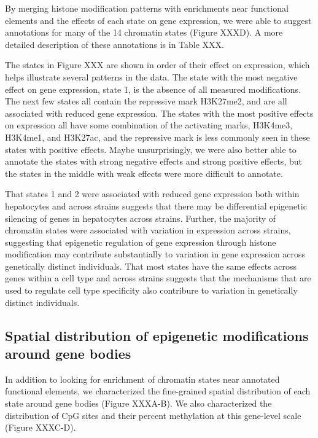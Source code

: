 \documentclass[10pt,letterpaper]{article}
\begin{document}
By merging histone modification patterns with enrichments near
functional elements and the effects of each state on gene expression, we
were able to suggest annotations for many of the 14 chromatin states
(Figure XXXD). A more detailed description of these annotations is in
Table XXX.

The states in Figure XXX are shown in order of their effect on
expression, which helps illustrate several patterns in the data. The
state with the most negative effect on gene expression, state 1, is the
absence of all measured modifications. The next few states all contain
the repressive mark H3K27me2, and are all associated with reduced gene
expression. The states with the most positive effects on expression all
have some combination of the activating marks, H3K4me3, H3K4me1, and
H3K27ac, and the repressive mark is less commonly seen in these states
with positive effects. Maybe unsurprisingly, we were also better able to
annotate the states with strong negative effects and strong positive
effects, but the states in the middle with weak effects were more
difficult to annotate.

That states 1 and 2 were associated with reduced gene expression both
within hepatocytes and across strains suggests that there may be
differential epigenetic silencing of genes in hepatocytes across
strains. Further, the majority of chromatin states were associated with
variation in expression across strains, suggesting that epigenetic
regulation of gene expression through histone modification may
contribute substantially to variation in gene expression across
genetically distinct individuals. That most states have the same effects
across genes within a cell type and across strains suggests that the
mechanisms that are used to regulate cell type specificity also
contribure to variation in genetically distinct individuals.

\hypertarget{spatial-distribution-of-epigenetic-modifications-around-gene-bodies}{%
\subsection{Spatial distribution of epigenetic modifications around gene
bodies}\label{spatial-distribution-of-epigenetic-modifications-around-gene-bodies}}

In addition to looking for enrichment of chromatin states near annotated
functional elements, we characterized the fine-grained spatial
distribution of each state around gene bodies (Figure XXXA-B). We also
characterized the distribution of CpG sites and their percent
methylation at this gene-level scale (Figure XXXC-D).
\end{document}
